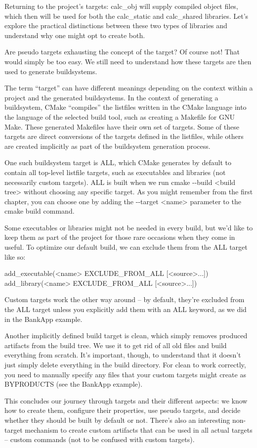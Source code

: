 Returning to the project’s targets: calc\_obj will supply compiled object files, which then will be used for both the calc\_static and calc\_shared libraries. Let’s explore the practical distinctions between these two types of libraries and understand why one might opt to create both.

Are pseudo targets exhausting the concept of the target? Of course not! That would simply be too easy. We still need to understand how these targets are then used to generate buildsystems.


The term “target” can have different meanings depending on the context within a project and the generated buildsystems. In the context of generating a buildsystem, CMake “compiles” the listfiles written in the CMake language into the language of the selected build tool, such as creating a Makefile for GNU Make. These generated Makefiles have their own set of targets. Some of these targets are direct conversions of the targets defined in the listfiles, while others are created implicitly as part of the buildsystem generation process.

One such buildsystem target is ALL, which CMake generates by default to contain all top-level listfile targets, such as executables and libraries (not necessarily custom targets). ALL is built when we run cmake -{}-build <build tree> without choosing any specific target. As you might remember from the first chapter, you can choose one by adding the -{}-target <name> parameter to the cmake build command.

Some executables or libraries might not be needed in every build, but we’d like to keep them as part of the project for those rare occasions when they come in useful. To optimize our default build, we can exclude them from the ALL target like so:

\begin{shell}
add_executable(<name> EXCLUDE_FROM_ALL [<source>...])
add_library(<name> EXCLUDE_FROM_ALL [<source>...])
\end{shell}

Custom targets work the other way around – by default, they’re excluded from the ALL target unless you explicitly add them with an ALL keyword, as we did in the BankApp example.

Another implicitly defined build target is clean, which simply removes produced artifacts from the build tree. We use it to get rid of all old files and build everything from scratch. It’s important, though, to understand that it doesn’t just simply delete everything in the build directory. For clean to work correctly, you need to manually specify any files that your custom targets might create as BYPRODUCTS (see the BankApp example).

This concludes our journey through targets and their different aspects: we know how to create them, configure their properties, use pseudo targets, and decide whether they should be built by default or not. There’s also an interesting non-target mechanism to create custom artifacts that can be used in all actual targets – custom commands (not to be confused with custom targets).

